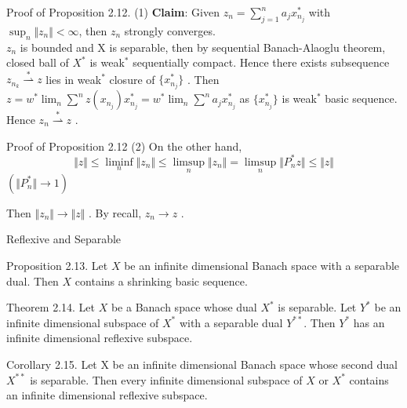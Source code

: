 \documentclass{beamer}
\newcommand{\wsconverge}{\mathop{\rightharpoonup}\limits^{*}}
\begin{document}
\begin{frame}{Proof of Proposition 2.12. (1)}
    \textbf{Claim}: Given $z_n=\sum_{j=1}^n a_j x_{n_j}^*$ with $\sup_n \Vert z_n \Vert < \infty$, then $z_n$ strongly converges.\\
    $z_n$ is bounded and X is separable, then by sequential Banach-Alaoglu theorem, closed ball of $X^*$ is weak$^*$ sequentially compact. Hence there exists subsequence $z_{n_k} \wsconverge z $ lies in weak$^*$ closure of $\{x_{n_j}^*\}$ . Then $z=w^*\lim_n\sum^n z(x_{n_j})x_{n_j}^*= w^*\lim_n\sum^n a_j x_{n_j}^*$ as $\{x_{n_j}^*\}$ is weak$^*$ basic sequence. Hence $z_n \wsconverge z$ .

    
\end{frame}
\begin{frame}{Proof of Proposition 2.12 (2)}
    On the other hand,
    $$\Vert z\Vert \leq \liminf_n\Vert z_n\Vert \leq \limsup_n\Vert z_n \Vert = \limsup_n \Vert P_n^*z \Vert \leq \Vert z \Vert$$ $(\Vert P_n^* \Vert \to 1)$

    Then $\Vert z_n\Vert \to \Vert z\Vert$ . By recall, $z_n\to z$ .
\end{frame}
\begin{frame}{Reflexive and Separable}
\begin{block}{Proposition 2.13.}
        Let $X$ be an infinite dimensional Banach space with a separable dual. Then $X$ contains a shrinking basic sequence.
    \end{block}
    \begin{block}{Theorem 2.14.}
        Let $X$ be a Banach space whose dual $X^*$ is separable. Let $Y^*$ be an infinite dimensional subspace of $X^*$ with a separable dual $Y^{**}$. Then $Y^*$ has an infinite dimensional reflexive subspace.
    \end{block}
    \begin{block}{Corollary 2.15.}
        Let X be an infinite dimensional Banach space whose second dual $X^{**}$ is separable. Then every infinite dimensional subspace of $X$ or $X^*$ contains an infinite dimensional reflexive subspace. 
    \end{block}
\end{frame}
\end{document}
